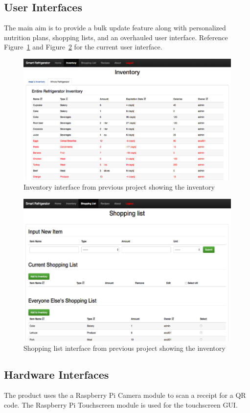 \subsection{User Interfaces}
The main aim is to provide a bulk update feature along with personalized nutrition plans, shopping lists, and an overhauled user interface. Reference Figure~\ref{GUI1} and Figure~\ref{GUI2} for the current user interface. 
\begin{figure}[p]
	\centering
	\includegraphics[width=\textwidth]{gui.png}
	\caption{Inventory interface from previous project showing the inventory}
	\label{GUI1}
\end{figure}
\begin{figure}[p]
	\centering
	\includegraphics[width=\textwidth]{gui1.png}
	\caption{Shopping list interface from previous project showing the inventory}
	\label{GUI2}
\end{figure}
\subsection{Hardware Interfaces} The product uses the a Raspberry Pi Camera module to scan a receipt for a QR code. The Raspberry Pi Touchscreen module is used for the touchscreen GUI. 

